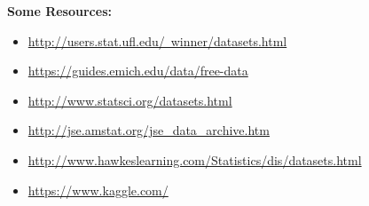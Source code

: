 \documentclass{article}\usepackage[]{graphicx}\usepackage[]{xcolor}
\begin{document}
\vspace{.2cm}

\textbf{Some Resources:}
\begin{itemize}
	\item \href{http://users.stat.ufl.edu/~winner/datasets.html}{http://users.stat.ufl.edu/~winner/datasets.html}
	\item \href{https://guides.emich.edu/data/free-data}{https://guides.emich.edu/data/free-data}
	\item \href{http://www.statsci.org/datasets.html}{http://www.statsci.org/datasets.html}
	\item \href{http://jse.amstat.org/jse_data_archive.htm}{http://jse.amstat.org/jse\_data\_archive.htm}
	\item \href{http://www.hawkeslearning.com/Statistics/dis/datasets.html}{http://www.hawkeslearning.com/Statistics/dis/datasets.html}
	\item \href{https://www.kaggle.com/}{https://www.kaggle.com/}
\end{itemize}
\end{document}
